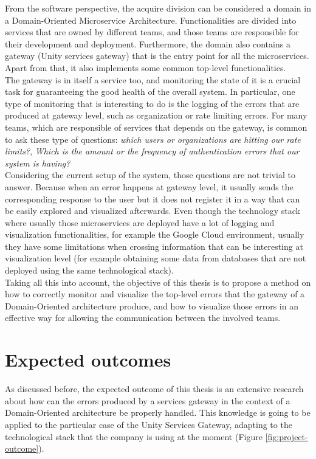 \documentclass[12pt]{article}
\begin{document}
From the software perspective, the acquire division can be considered a domain in a Domain-Oriented Microservice Architecture. Functionalities are divided into services that are owned by different teams, and those teams are responsible for their development and deployment. Furthermore, the domain also contains a gateway (Unity services gateway) that is the entry point for all the microservices. Apart from that, it also implements some common top-level functionalities.\\

The gateway is in itself a service too, and monitoring the state of it is a crucial task for guaranteeing the good health of the overall system. In particular, one type of monitoring that is interesting to do is the logging of the errors that are produced at gateway level, such as organization or rate limiting errors. For many teams, which are responsible of services that depends on the gateway, is common to ask these type of questions: \textit{which users or organizations are hitting our rate limits?}, \textit{Which is the amount or the frequency of authentication errors that our system is having?}\\

Considering the current setup of the system, those questions are not trivial to answer. Because when an error happens at gateway level, it usually sends the corresponding response to the user but it does not register it in a way that can be easily explored and visualized afterwards. Even though the technology stack where usually those microservices are deployed have a lot of logging and visualization functionalities, for example the Google Cloud environment, usually they have some limitations when crossing information that can be interesting at visualization level (for example obtaining some data from databases that are not deployed using the same technological stack).\\ 

Taking all this into account, the objective of this thesis is to propose a method on how to correctly monitor and visualize the top-level errors that the gateway of a Domain-Oriented architecture produce, and how to visualize those errors in an effective way for allowing the communication between the involved teams.

\section{Expected outcomes}

As discussed before, the expected outcome of this thesis is an extensive research about how can the errors produced by a services gateway in the context of a Domain-Oriented architecture be properly handled. This knowledge is going to be applied to the particular case of the Unity Services Gateway, adapting to the technological stack that the company is using at the moment (Figure \ref{fig:project-outcome}).
\end{document}

